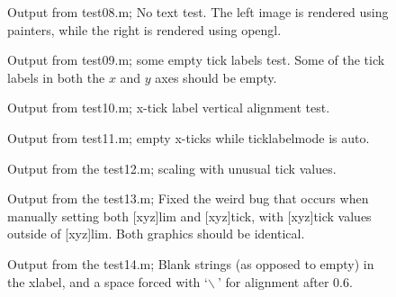 \documentclass[a4paper,11pt]{article}
\begin{document}
     \begin{figure}[ht]
       \centering
       \quad
       \caption{Output from {\ttfamily test08.m}; No text test. The left image is rendered using
       painters, while the right is rendered using opengl.}
     \end{figure}
     \begin{figure}
       \centering
       \caption{Output from {\ttfamily test09.m}; some empty tick labels test. Some of the tick labels
       in both the $x$ and $y$ axes should be empty.}
%
\clearpage
%
     \end{figure}
     \begin{figure}
       \centering
       \caption{Output from {\ttfamily test10.m}; x-tick label vertical alignment test.}
     \end{figure}
     \begin{figure}
       \centering
       \caption{Output from {\ttfamily test11.m}; empty x-ticks while {\ttfamily ticklabelmode}
       is {\ttfamily auto}.}
     \end{figure}
     \begin{figure}[ht]
       \centering
       \caption{Output from the {\ttfamily test12.m}; scaling with unusual tick values.}
     \end{figure}
     \begin{figure}[ht]
       \centering
       \quad
       \caption{Output from the {\ttfamily test13.m}; Fixed the weird bug that occurs when
         manually setting both [xyz]lim and [xyz]tick, with [xyz]tick values outside of [xyz]lim.
         Both graphics should be identical.}
     \end{figure}
     \begin{figure}[ht]
       \centering
       \caption{Output from the {\ttfamily test14.m}; Blank strings (as opposed to empty) in the
         xlabel, and a space forced with {\ttfamily `$\backslash~$'} for alignment after $0.6$.}
     \end{figure}
\end{document}
